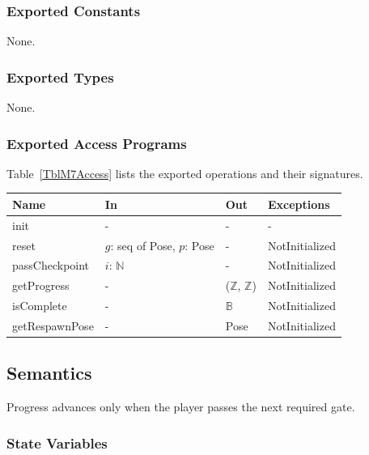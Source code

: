 \documentclass[12pt, titlepage]{article}
\begin{document}
\subsubsection{Exported Constants}

None.

\subsubsection{Exported Types}

None.

\subsubsection{Exported Access Programs}

Table~\ref{TblM7Access} lists the exported operations and their signatures.

\begin{center}
\begin{minipage}{\textwidth}
\begin{tabularx}{\textwidth}{p{3.2cm} p{3.6cm} p{2.4cm} X}
\toprule
\textbf{Name} & \textbf{In} & \textbf{Out} & \textbf{Exceptions} \\
\midrule
init & - & - & - \\
reset & $g$: seq of Pose, $p$: Pose & - & NotInitialized \\
passCheckpoint & $i$: $\mathbb{N}$ & - & NotInitialized \\
getProgress & - & ($\mathbb{Z}$, $\mathbb{Z}$) & NotInitialized \\
isComplete & - & $\mathbb{B}$ & NotInitialized \\
getRespawnPose & - & Pose & NotInitialized \\
\bottomrule
\end{tabularx}
\label{TblM7Access}
\end{minipage}
\end{center}

\subsection{Semantics}

Progress advances only when the player passes the next required gate.

\subsubsection{State Variables}
\end{document}
